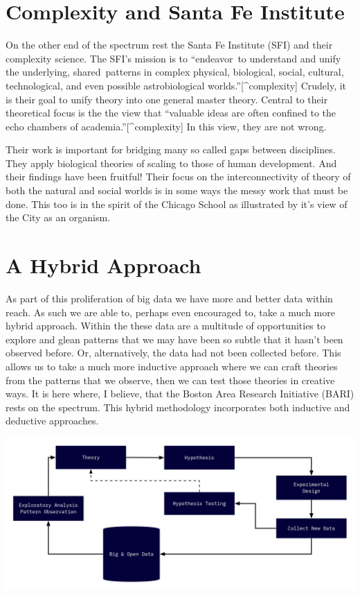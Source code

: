 \documentclass[
]{book}
\begin{document}
\hypertarget{complexity-and-santa-fe-institute}{%
\section{Complexity and Santa Fe Institute}\label{complexity-and-santa-fe-institute}}

On the other end of the spectrum rest the Santa Fe Institute (SFI) and their complexity science. The SFI's mission is to ``endeavor~to understand and unify the underlying, shared~patterns in complex physical, biological, social, cultural, technological, and even possible astrobiological worlds.''{[}\^{}complexity{]} Crudely, it is their goal to unify theory into one general master theory. Central to their theoretical focus is the the view that ``valuable ideas are often confined to the echo chambers of academia.''{[}\^{}complexity{]} In this view, they are not wrong.

Their work is important for bridging many so called gaps between disciplines. They apply biological theories of scaling to those of human development. And their findings have been fruitful! Their focus on the interconnectivity of theory of both the natural and social worlds is in some ways the messy work that must be done. This too is in the spirit of the Chicago School as illustrated by it's view of the City as an organism.

\hypertarget{a-hybrid-approach}{%
\section{A Hybrid Approach}\label{a-hybrid-approach}}

As part of this proliferation of big data we have more and better data within reach. As such we are able to, perhaps even encouraged to, take a much more hybrid approach. Within the these data are a multitude of opportunities to explore and glean patterns that we may have been so subtle that it hasn't been observed before. Or, alternatively, the data had not been collected before. This allows us to take a much more inductive approach where we can craft theories from the patterns that we observe, then we can test those theories in creative ways. It is here where, I believe, that the Boston Area Research Initiative (BARI) rests on the spectrum. This hybrid methodology incorporates both inductive and deductive approaches.

\includegraphics{static/hybrid-approach.png}
\end{document}
